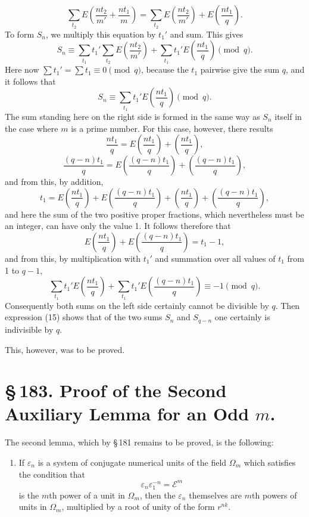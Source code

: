 \documentclass[11pt]{article}
\begin{document}
\[
\sum_{t_2}E\left(\frac{nt_2}{m'}+\frac{nt_1}{m}\right)
=
\sum_{t_2}E\left(\frac{nt_2}{m'}\right)+E\left(\frac{nt_1}{q}\right).
\]
To form $S_n$, we multiply this equation by $t_1'$ and sum. This gives
\[
S_n\equiv \sum_{t_1}t_1'\sum_{t_2}E\left(\frac{nt_2}{m'}\right)+\sum_{t_1}t_1'E\left(\frac{nt_1}{q}\right)\pmod q.
\]
Here now $\sum t_1'=\sum t_1\equiv0\pmod q$, because the $t_1$ pairwise give the sum $q$, and it follows that
\begin{equation}
S_n\equiv\sum_{t_1}t_1'E\left(\frac{nt_1}{q}\right)\pmod q.
\tag{15}
\end{equation}
The sum standing here on the right side is formed in the same way as $S_n$ itself in the case where $m$ is a prime number. For this case, however, there results
\[
\frac{nt_1}{q}=E\left(\frac{nt_1}{q}\right)+\left(\frac{nt_1}{q}\right),
\]
\[
\frac{(q-n)t_1}{q}=E\left(\frac{(q-n)t_1}{q}\right)+\left(\frac{(q-n)t_1}{q}\right),
\]
and from this, by addition,
\[
t_1=E\left(\frac{nt_1}{q}\right)+E\left(\frac{(q-n)t_1}{q}\right)+\left(\frac{nt_1}{q}\right)+\left(\frac{(q-n)t_1}{q}\right),
\]
and here the sum of the two positive proper fractions, which nevertheless must be an integer, can have only the value 1. It follows therefore that
\[
E\left(\frac{nt_1}{q}\right)+E\left(\frac{(q-n)t_1}{q}\right)=t_1-1,
\]
and from this, by multiplication with $t_1'$ and summation over all values of $t_1$ from 1 to $q-1$,
\[
\sum_{t_1}t_1'E\left(\frac{nt_1}{q}\right)+\sum_{t_1}t_1'E\left(\frac{(q-n)t_1}{q}\right)\equiv -1\pmod q.
\]
Consequently both sums on the left side certainly cannot be divisible by $q$. Then expression (15) shows that of the two sums $S_n$ and $S_{q-n}$ one certainly is indivisible by $q$.

This, however, was to be proved.

\section*{\S\,183. Proof of the Second Auxiliary Lemma for an Odd $m$.}

The second lemma, which by \S\,181 remains to be proved, is the following:

\begin{enumerate}[label=\arabic*.,leftmargin=2.2em,start=2]
\item If $\varepsilon_n$ is a system of conjugate numerical units of the field $\Omega_m$ which satisfies the condition that
\begin{equation}
\varepsilon_n\varepsilon_1^{-n}=\mathscr E^m
\tag{1}
\end{equation}
is the $m$th power of a unit in $\Omega_m$, then the $\varepsilon_n$ themselves are $m$th powers of units in $\Omega_m$, multiplied by a root of unity of the form $r^{nk}$.
\end{enumerate}
\end{document}
